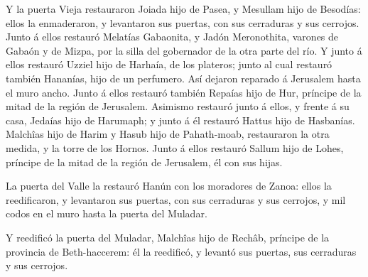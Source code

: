  Y la puerta Vieja restauraron Joiada hijo de Pasea, y
Mesullam hijo de Besodías: ellos la enmaderaron, y levantaron sus
puertas, con sus cerraduras y sus cerrojos.  Junto á ellos
restauró Melatías Gabaonita, y Jadón Meronothita, varones de Gabaón y de
Mizpa, por la silla del gobernador de la otra parte del río.
 Y junto á ellos restauró Uzziel hijo de Harhaía, de los
plateros; junto al cual restauró también Hananías, hijo de un perfumero.
Así dejaron reparado á Jerusalem hasta el muro ancho. 
Junto á ellos restauró también Repaías hijo de Hur, príncipe de la mitad
de la región de Jerusalem.  Asimismo restauró junto á
ellos, y frente á su casa, Jedaías hijo de Harumaph; y junto á él
restauró Hattus hijo de Hasbanías.  Malchîas hijo de
Harim y Hasub hijo de Pahath-moab, restauraron la otra medida, y la
torre de los Hornos.  Junto á ellos restauró Sallum hijo
de Lohes, príncipe de la mitad de la región de Jerusalem, él con sus
hijas.

 La puerta del Valle la restauró Hanún con los moradores
de Zanoa: ellos la reedificaron, y levantaron sus puertas, con sus
cerraduras y sus cerrojos, y mil codos en el muro hasta la puerta del
Muladar.

 Y reedificó la puerta del Muladar, Malchîas hijo de
Rechâb, príncipe de la provincia de Beth-haccerem: él la reedificó, y
levantó sus puertas, sus cerraduras y sus cerrojos.

